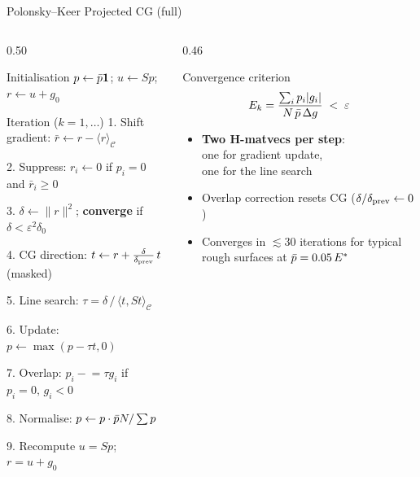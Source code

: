 \begin{frame}{Polonsky--Keer Projected CG (full)}
\begin{columns}[T]
\begin{column}{0.50\textwidth}
  \begin{block}{Initialisation}
    $p \leftarrow \bar{p}\mathbf{1}$;\quad
    $u \leftarrow Sp$;\quad
    $r \leftarrow u + g_0$
  \end{block}
  \begin{block}{Iteration ($k=1,\ldots$)}
    1. Shift gradient:
    $\bar r \leftarrow r - \langle r\rangle_{\mathcal{C}}$
    \par 2. Suppress: $r_i \leftarrow 0$ if $p_i=0$ and $\bar r_i \ge 0$
    \par 3. $\delta \leftarrow \|r\|^2$;\quad
      \textbf{converge} if $\delta < \varepsilon^2\delta_0$
    \par 4. CG direction: $t \leftarrow r + \tfrac{\delta}{\delta_{\rm prev}}\,t$
      (masked)
    \par 5. Line search: $\tau = \delta\,/\,\langle t,St\rangle_{\mathcal{C}}$
    \par 6. Update: $p \leftarrow \max(p - \tau t, 0)$
    \par 7. Overlap: $p_i \mathrel{-}= \tau g_i$ if $p_i=0,\,g_i<0$
    \par 8. Normalise: $p \leftarrow p\cdot\bar{p} N/\textstyle\sum p$
    \par 9. Recompute $u = Sp$;\; $r = u + g_0$
  \end{block}
\end{column}
\begin{column}{0.46\textwidth}
  \begin{block}{Convergence criterion}
    \[
      E_k = \frac{\sum_i p_i |g_i|}{N\,\bar{p}\,\Delta g}
      \;<\;\varepsilon
    \]
  \end{block}
  \vspace{0.4em}
  \begin{itemize}
    \item \textbf{Two H-matvecs per step}:\\
      one for gradient update,\\
      one for the line search
    \item Overlap correction resets CG
      ($\delta/\delta_{\rm prev}\leftarrow 0$)
    \item Converges in $\lesssim 30$ iterations
      for typical rough surfaces at
      $\bar{p}=0.05\,E^*$
  \end{itemize}
\end{column}
\end{columns}
\end{frame}

